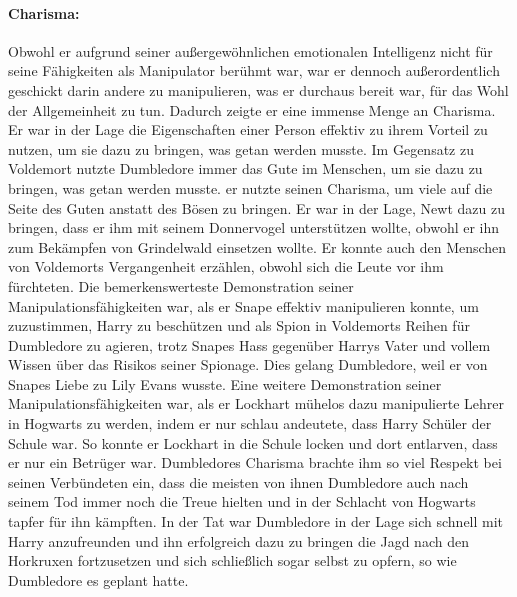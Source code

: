 \documentclass[a4paper, 10pt]{article}
\begin{document}
\paragraph{Charisma:}
Obwohl er aufgrund seiner außergewöhnlichen emotionalen Intelligenz nicht für seine Fähigkeiten als Manipulator berühmt war, war er dennoch außerordentlich geschickt darin andere zu manipulieren, was er durchaus bereit war, für das Wohl der Allgemeinheit zu tun. Dadurch zeigte er eine immense Menge an Charisma. Er war in der Lage die Eigenschaften einer Person effektiv zu ihrem Vorteil zu nutzen, um sie dazu zu bringen, was getan werden musste. Im Gegensatz zu Voldemort nutzte Dumbledore immer das Gute im Menschen, um sie dazu zu bringen, was getan werden musste. er nutzte seinen Charisma, um viele auf die Seite des Guten anstatt des Bösen zu bringen. Er war in der Lage, Newt dazu zu bringen, dass er ihm mit seinem Donnervogel unterstützen wollte, obwohl er ihn zum Bekämpfen von Grindelwald einsetzen wollte. Er konnte auch den Menschen von Voldemorts Vergangenheit erzählen, obwohl sich die Leute vor ihm fürchteten. Die bemerkenswerteste Demonstration seiner Manipulationsfähigkeiten war, als er Snape effektiv manipulieren konnte, um zuzustimmen, Harry zu beschützen und als Spion in Voldemorts Reihen für Dumbledore zu agieren, trotz Snapes Hass gegenüber Harrys Vater und vollem Wissen über das Risikos seiner Spionage. Dies gelang Dumbledore, weil er von Snapes Liebe zu Lily Evans wusste. Eine weitere Demonstration seiner Manipulationsfähigkeiten war, als er Lockhart mühelos dazu manipulierte Lehrer in Hogwarts zu werden, indem er nur schlau andeutete, dass Harry Schüler der Schule war. So konnte er Lockhart in die Schule locken und dort entlarven, dass er nur ein Betrüger war. Dumbledores Charisma brachte ihm so viel Respekt bei seinen Verbündeten ein, dass die meisten von ihnen Dumbledore auch nach seinem Tod immer noch die Treue hielten und in der Schlacht von Hogwarts tapfer für ihn kämpften. In der Tat war Dumbledore in der Lage sich schnell mit Harry anzufreunden und ihn erfolgreich dazu zu bringen die Jagd nach den Horkruxen fortzusetzen und sich schließlich sogar selbst zu opfern, so wie Dumbledore es geplant hatte.
\end{document}
